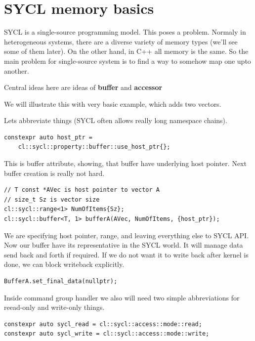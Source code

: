 \documentclass[a4paper,12pt,oneside]{article}
\begin{document}
\section{SYCL memory basics}\label{sec:Basics}


SYCL is a single-source programming model. This poses a problem. Normaly in heterogeneous systems, there are a diverse variety of memory types (we'll see some of them later). On the other hand, in C++ all memory is the same. So the main problem for single-source system is to find a way to somehow map one upto another.

Central ideas here are ideas of \textbf{buffer} and \textbf{accessor}

We will illustrate this with very basic example, which adds two vectors.

Lets abbreviate things (SYCL often allows really long namespace chains).

\begin{lstlisting}
constexpr auto host_ptr = 
    cl::sycl::property::buffer::use_host_ptr{};
\end{lstlisting}

This is buffer attribute, showing, that buffer have underlying host pointer. Next buffer creation is really not hard.

\begin{lstlisting}
// T const *AVec is host pointer to vector A
// size_t Sz is vector size
cl::sycl::range<1> NumOfItems{Sz};
cl::sycl::buffer<T, 1> bufferA(AVec, NumOfItems, {host_ptr});
\end{lstlisting}

We are specifying host pointer, range, and leaving everything else to SYCL API. Now our buffer have its representative in the SYCL world. It will manage data send back and forth if required. If we do not want it to write back after kernel is done, we can block writeback explicitly.

\begin{lstlisting}
BufferA.set_final_data(nullptr);
\end{lstlisting}

Inside command group handler we also will need two simple abbreviations for reead-only and write-only things.

\begin{lstlisting}
constexpr auto sycl_read = cl::sycl::access::mode::read;
constexpr auto sycl_write = cl::sycl::access::mode::write;
\end{lstlisting}
\end{document}
